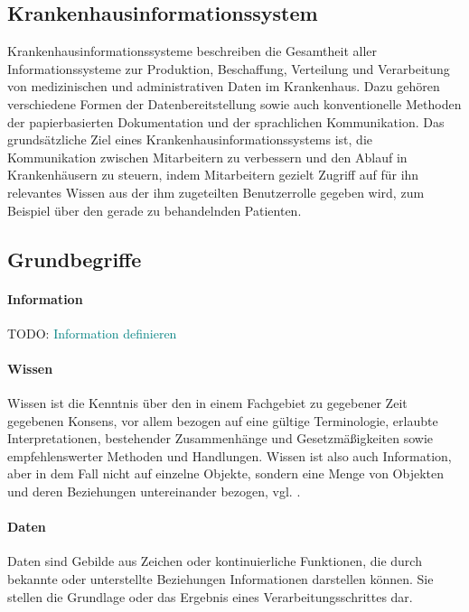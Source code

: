 \documentclass[headsepline,titlepage,ngerman,twoside,12pt]{report}
\newcommand\todo[1]{TODO: \textcolor{teal}{#1}}
\begin{document}
\subsection{Krankenhausinformationssystem}
Krankenhausinformationssysteme beschreiben die Gesamtheit aller Informationssysteme zur Produktion, Beschaffung, Verteilung und Verarbeitung von medizinischen und administrativen Daten im Krankenhaus.
Dazu gehören verschiedene Formen der Datenbereitstellung sowie auch konventionelle Methoden der papierbasierten Dokumentation und der sprachlichen Kommunikation.
Das grundsätzliche Ziel eines Krankenhausinformationssystems ist, die Kommunikation zwischen Mitarbeitern zu verbessern und den Ablauf in Krankenhäusern zu steuern, indem Mitarbeitern gezielt Zugriff auf für ihn relevantes Wissen aus der ihm zugeteilten Benutzerrolle gegeben wird, zum Beispiel über den gerade zu behandelnden Patienten.
\subsection{Grundbegriffe}
\paragraph{Information}
\todo{Information definieren}
\paragraph{Wissen}
Wissen ist die Kenntnis über den in einem Fachgebiet zu gegebener Zeit gegebenen Konsens, vor allem bezogen auf eine gültige Terminologie, erlaubte Interpretationen, bestehender Zusammenhänge und Gesetzmäßigkeiten sowie empfehlenswerter Methoden und Handlungen.
Wissen ist also auch Information, aber in dem Fall nicht auf einzelne Objekte, sondern eine Menge von Objekten und deren Beziehungen untereinander bezogen, vgl. \citet{his}.
\paragraph{Daten}
Daten sind Gebilde aus Zeichen oder kontinuierliche Funktionen, die durch bekannte oder unterstellte Beziehungen Informationen darstellen können.
Sie stellen die Grundlage oder das Ergebnis eines Verarbeitungsschrittes dar. 
\end{document}
